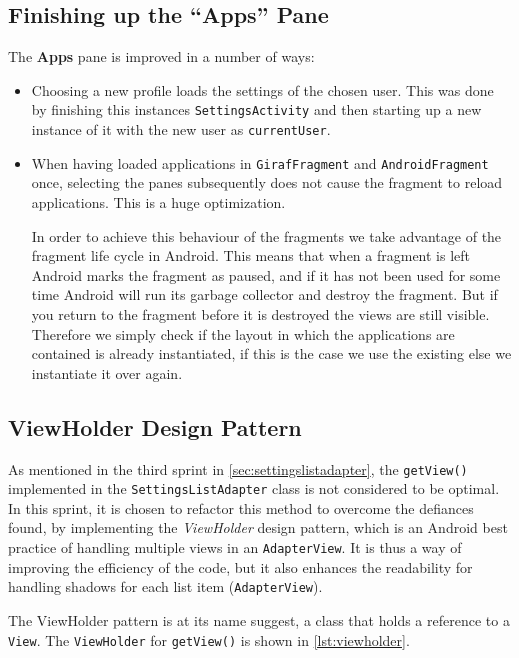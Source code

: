 \subsection{Finishing up the ``Apps'' Pane}

The \textbf{Apps} pane is improved in a number of ways:
\begin{itemize}
\item Choosing a new profile loads the settings of the chosen user.
This was done by finishing this instances \lstinline|SettingsActivity| and then starting up a new instance of it with the new user as \lstinline|currentUser|.
\item When having loaded applications in \lstinline|GirafFragment| and \lstinline|AndroidFragment| once, selecting the panes subsequently does not cause the fragment to reload applications. This is a huge optimization.

In order to achieve this behaviour of the fragments we take advantage of the fragment life cycle in Android. This means that when a fragment is left Android marks the fragment as paused, and if it has not been used for some time Android will run its garbage collector and destroy the fragment. But if you return to the fragment before it is destroyed the views are still visible. Therefore we simply check if the layout in which the applications are contained is already instantiated, if this is the case we use the existing else we instantiate it over again.

\end{itemize}

\subsection{ViewHolder Design Pattern}
As mentioned in the third sprint in \cref{sec:settingslistadapter}, the \lstinline|getView()| implemented in the \lstinline|SettingsListAdapter| class is not considered to be optimal.
In this sprint, it is chosen to refactor this method to overcome the defiances found, by implementing the \textit{ViewHolder} design pattern, which is an Android best practice of handling multiple views in an \lstinline|AdapterView|.
It is thus a way of improving the efficiency of the code, but it also enhances the readability for handling shadows for each list item (\lstinline|AdapterView|).

The ViewHolder pattern is at its name suggest, a class that holds a reference to a \lstinline|View|.
The \lstinline|ViewHolder| for \lstinline|getView()| is shown in \cref{lst:viewholder}.

